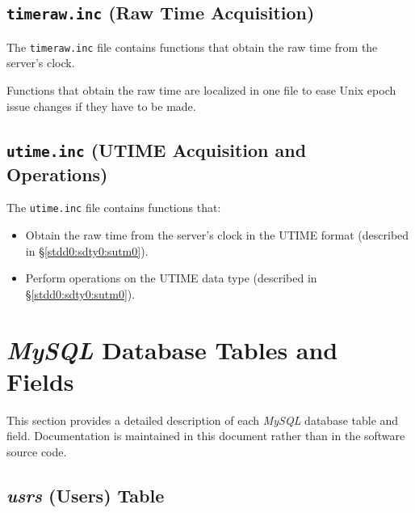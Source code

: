 \documentclass[letterpaper,10pt,titlepage]{article}
\begin{document}

\subsection{\texttt{timeraw.inc} (Raw Time Acquisition)}
\label{sphl0:strw0}

The \texttt{timeraw.inc} file contains
functions that obtain the raw time from the server's clock.

Functions that obtain the raw time are localized in one file to ease
Unix epoch issue changes if they have to be made.


\subsection{\texttt{utime.inc} (UTIME Acquisition and Operations)}
\label{sphl0:sutm0}

The \texttt{utime.inc} file contains
functions that:

\begin{itemize}
\item Obtain the raw time from the server's clock in the UTIME
      format (described in \S{}\ref{stdd0:sdty0:sutm0}).
\item Perform operations on the UTIME data type
      (described in \S{}\ref{stdd0:sdty0:sutm0}).
\end{itemize}


\clearpage{}
\section{\emph{MySQL} Database Tables and Fields}
\label{sdtf0}

This section provides a detailed description of each \emph{MySQL} database table
and field.  Documentation is maintained in this document rather than in
the software source code.

\subsection{\emph{usrs} (Users) Table}
\label{sdtf0:susr0}
\end{document}
